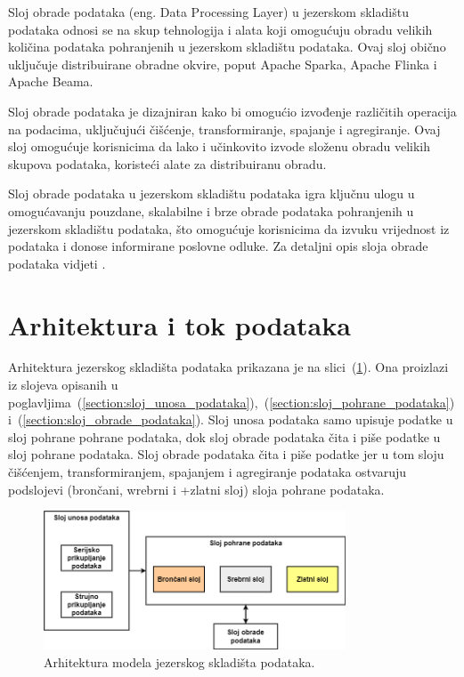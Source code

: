 Sloj obrade podataka (eng. Data Processing Layer) u jezerskom skladištu podataka
odnosi se na skup tehnologija i alata koji omogućuju obradu velikih količina
podataka pohranjenih u jezerskom skladištu podataka. Ovaj sloj obično uključuje
distribuirane obradne okvire, poput Apache Sparka, Apache Flinka i Apache Beama.

Sloj obrade podataka je dizajniran kako bi omogućio izvođenje različitih
operacija na podacima, uključujući čišćenje, transformiranje, spajanje i
agregiranje. Ovaj sloj omogućuje korisnicima da lako i učinkovito izvode složenu
obradu velikih skupova podataka, koristeći alate za distribuiranu obradu.

Sloj obrade podataka u jezerskom skladištu podataka igra ključnu ulogu u
omogućavanju pouzdane, skalabilne i brze obrade podataka pohranjenih u jezerskom
skladištu podataka, što omogućuje korisnicima da izvuku vrijednost iz podataka i
donose informirane poslovne odluke. Za detaljni opis sloja obrade podataka
vidjeti \cite{datalakehouse2022}.

\section{Arhitektura i tok podataka} \label{section:arhitektura_i_tok_podataka}

Arhitektura jezerskog skladišta podataka prikazana je na
slici~(\ref{figure:datalakehouse_architecture}). Ona proizlazi iz slojeva
opisanih u
poglavljima~(\ref{section:sloj_unosa_podataka}),~(\ref{section:sloj_pohrane_podataka})
i~(\ref{section:sloj_obrade_podataka}). Sloj unosa podataka samo upisuje podatke
u sloj pohrane pohrane podataka, dok sloj obrade podataka čita i piše podatke u
sloj pohrane podataka. Sloj obrade podataka čita i piše podatke jer u tom sloju
čišćenjem, transformiranjem, spajanjem i agregiranje podataka ostvaruju
podslojevi (brončani, wrebrni i +zlatni sloj) sloja pohrane podataka.

\begin{figure}[htb]
    \centering
    \includegraphics[width=0.8\textwidth]{images/arhitektura.drawio.png}
    \caption{Arhitektura modela jezerskog skladišta podataka.}
    \label{figure:datalakehouse_architecture}
\end{figure}

